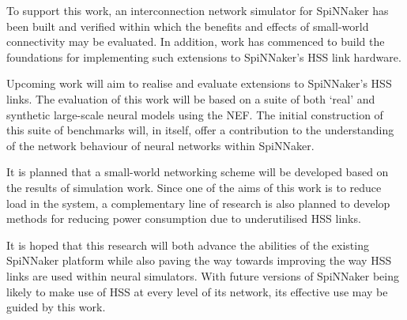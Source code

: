 	To support this work, an interconnection network simulator for SpiNNaker has
	been built and verified within which the benefits and effects of small-world
	connectivity may be evaluated. In addition, work has commenced to build the
	foundations for implementing such extensions to SpiNNaker's HSS link hardware.
	
	Upcoming work will aim to realise and evaluate extensions to SpiNNaker's HSS
	links. The evaluation of this work will be based on a suite of both `real' and
	synthetic large-scale neural models using the NEF.  The initial construction
	of this suite of benchmarks will, in itself, offer a contribution to the
	understanding of the network behaviour of neural networks within SpiNNaker.
	
	It is planned that a small-world networking scheme will be developed based on
	the results of simulation work. Since one of the aims of this work is to
	reduce load in the system, a complementary line of research is also planned to
	develop methods for reducing power consumption due to underutilised HSS links.
	
	It is hoped that this research will both advance the abilities of the existing
	SpiNNaker platform while also paving the way towards improving the way HSS
	links are used within neural simulators. With future versions of SpiNNaker
	being likely to make use of HSS at every level of its network, its effective
	use may be guided by this work.
	

